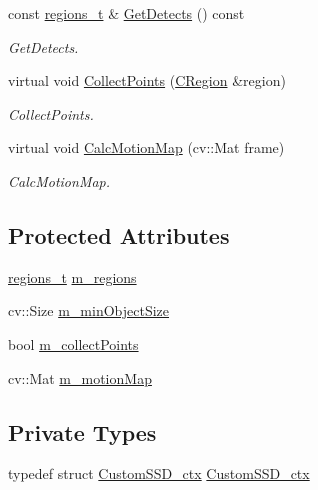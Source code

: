 \begin{DoxyCompactItemize}
const \mbox{\hyperlink{defines_8h_a01db0de56a20f4342820a093c5154536}{regions\+\_\+t}} \& \mbox{\hyperlink{class_base_detector_a52ac4b2feed15a47de84a69eb45c233f}{Get\+Detects}} () const
\begin{DoxyCompactList}\small\item\em Get\+Detects. \end{DoxyCompactList}\item 
virtual void \mbox{\hyperlink{class_base_detector_a20380b0980c6f262b0829f37fb89d2a7}{Collect\+Points}} (\mbox{\hyperlink{class_c_region}{C\+Region}} \&region)
\begin{DoxyCompactList}\small\item\em Collect\+Points. \end{DoxyCompactList}\item 
virtual void \mbox{\hyperlink{class_base_detector_a73c66f0d4dad263fcf65c09a6f6feda2}{Calc\+Motion\+Map}} (cv\+::\+Mat frame)
\begin{DoxyCompactList}\small\item\em Calc\+Motion\+Map. \end{DoxyCompactList}\end{DoxyCompactItemize}
\subsection*{Protected Attributes}
\begin{DoxyCompactItemize}
\item 
\mbox{\hyperlink{defines_8h_a01db0de56a20f4342820a093c5154536}{regions\+\_\+t}} \mbox{\hyperlink{class_base_detector_a409c20093acba261db8354ca72058fce}{m\+\_\+regions}}
\item 
cv\+::\+Size \mbox{\hyperlink{class_base_detector_a651b938c89c94daac4763728637d90c9}{m\+\_\+min\+Object\+Size}}
\item 
bool \mbox{\hyperlink{class_base_detector_a403cbf784fcb960bdb7d080c86c4a2ea}{m\+\_\+collect\+Points}}
\item 
cv\+::\+Mat \mbox{\hyperlink{class_base_detector_a45a2d54a0b69e271aa5c44ee301682b7}{m\+\_\+motion\+Map}}
\end{DoxyCompactItemize}
\subsection*{Private Types}
\begin{DoxyCompactItemize}
\item 
typedef struct \mbox{\hyperlink{class_s_s_d_custom_net_detector_a979c7a383a8951d8d549bdf9e1045aae}{Custom\+S\+S\+D\+\_\+ctx}} \mbox{\hyperlink{class_s_s_d_custom_net_detector_a979c7a383a8951d8d549bdf9e1045aae}{Custom\+S\+S\+D\+\_\+ctx}}
\end{DoxyCompactItemize}
